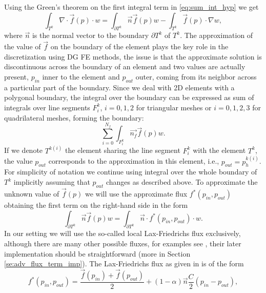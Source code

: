 Using the Green's theorem on the first integral term in \eqref{eq:sum_int_hyp} we
get
\begin{equation}
\label{eq:hyp_term}
\int_{T^k} \nabla\cdot \vec{f}(p)\cdot w = %
\int_{\partial{T^k}} \vec{n}\vec{f}(p)w - \int_{T^k} \vec{f}(p)\cdot\nabla w,
\end{equation}
where $\vec{n}$ is the normal vector to the boundary $\partial T^k$ of $T^k$.
The approximation of the value of $\vec{f}$ on the boundary of the
element plays the key role in the discretization using DG FE methods, the issue is
that the approximate solution is discontinuous across the boundary of an
element and two values are actually present, $p_{in}$ inner to the element and
$p_{out}$ outer, coming from its neighbor across a particular part of the
boundary. Since we deal with 2D
elements with a polygonal boundary, the integral over the boundary can be expressed as sum
of integrals over line segments ${F^k_i}$, $i=0,1,2$ for triangular meshes or
$i=0,1,2,3$ for quadrilateral meshes, forming the boundary:
\begin{equation}
\sum_{i=0}^{N_f} \int_{F^k_i} \vec{n_f}\vec{f}(p)w.
\end{equation}
If we denote $T^{k(i)}$ the element sharing the line segment $F^k_i$ with the
element $T^k$, the
value $p_{out}$ corresponds to the approximation in this element, i.e., $p_{out} =
p^{k(i)}_h$. For simplicity of notation we continue using integral over the whole
boundary of $T^k$ implicitly assuming that $p_{out}$ changes as described above. To
approximate the unknown value of $\vec{f}(p)$  we will use the approximate flux $f^*(p_{in},
p_{out})$ obtaining the first term on the right-hand side in the form
\begin{equation}
\label{eq:flux_integral}
\int_{\partial{T^k}} \vec{n}\vec{f}(p)w = \int_{\partial{T^k}} \vec{n}
\cdot f^{*} (p_{in}, p_{out})\cdot w.
\end{equation}
In our setting we will use the so-called local Lax-Friedrichs flux
exclusively, although there are many other possible fluxes, for examples see
\cite{Kucera, Cockburn2001a}, their later implementation should be straightforward (more
in Section \ref{se:adv_flux_term_imp}). The Lax-Friedrichs flux as given in
\cite{Hesthaven2008}
is of the form
\begin{equation}
\label{eq:lax-frieflux}
f^{*}(p_{in}, p_{out}) =   \frac{\vec{f}(p_{in}) + \vec{f}(p_{out})}{2}  + (1-\alpha)
\vec{n}\frac{C}{2}(p_{in} -
p_{out}),
\end{equation}
